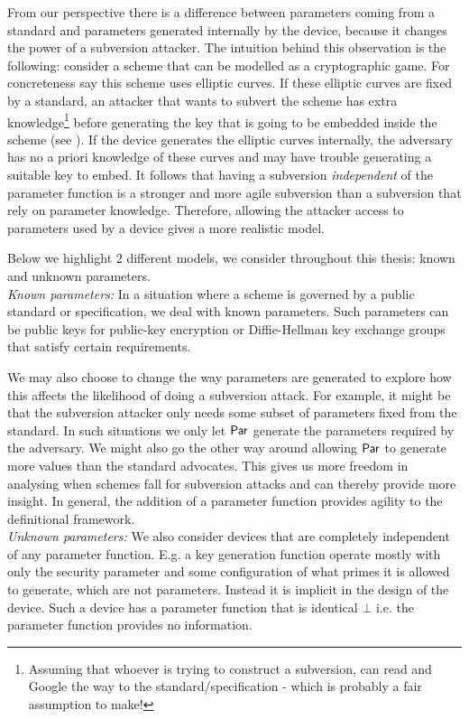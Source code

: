 From our perspective there is a difference between parameters coming from a standard and parameters generated internally by the device, because it changes the power of a subversion attacker. The intuition behind this observation is the following: consider a scheme that can be modelled as a cryptographic game. For concreteness say this scheme uses elliptic curves. If these elliptic curves are fixed by a standard, an attacker that wants to subvert the scheme has extra knowledge\footnote{Assuming that whoever is trying to construct a subversion, can read and Google the way to the standard/specification - which is probably a fair assumption to make!} before generating the key that is going to be embedded inside the scheme (see ). If the device generates the elliptic curves internally, the adversary has no a priori knowledge of these curves and may have trouble generating a suitable key to embed. It follows that having a subversion \emph{independent} of the parameter function is a stronger and more agile subversion than a subversion that rely on parameter knowledge. Therefore, allowing the attacker access to parameters used by a device gives a more realistic model.

Below we highlight 2 different models, we consider throughout this thesis: known and unknown parameters.\\

\noindent\textit{Known parameters:}
In a situation where a scheme is governed by a public standard or specification, we deal with known parameters. Such parameters can be public keys for public-key encryption or Diffie-Hellman key exchange groups that satisfy certain requirements. 

We may also choose to change the way parameters are generated to explore how this affects the likelihood of doing a subversion attack. For example, it might be that the subversion attacker only needs some subset of parameters fixed from the standard. In such situations we only let $\operatorname{\mathsf{Par}}$ generate the parameters required by the adversary. We might also go the other way around allowing $\operatorname{\mathsf{Par}}$ to generate more values than the standard advocates. This gives us more freedom in analysing when schemes fall for subversion attacks and can thereby provide more insight. In general, the addition of a parameter function provides agility to the definitional framework. \\ 

\noindent\textit{Unknown parameters:}
We also consider devices that are completely independent of any parameter function. E.g. a key generation function operate mostly with only the security parameter and some configuration of what primes it is allowed to generate, which are not parameters. Instead it is implicit in the design of the device. Such a device has a parameter function that is identical $\bot$ i.e. the parameter function provides no information.


